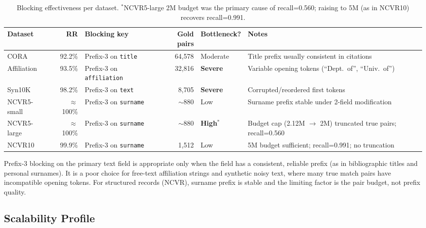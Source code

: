 \documentclass[11pt, a4paper]{article}
\begin{document}
\begin{table}[h!]
\centering
\small
\begin{tabularx}{\linewidth}{lrlrlW}
\toprule
\textbf{Dataset} & \textbf{RR} & \textbf{Blocking key} & \textbf{Gold pairs} &
\textbf{Bottleneck?} & \textbf{Notes} \\
\midrule
CORA         & 92.2\% & Prefix-3 on \texttt{title}       & 64,578  & Moderate & Title prefix usually consistent in citations \\
Affiliation  & 93.5\% & Prefix-3 on \texttt{affiliation} & 32,816  & \textbf{Severe}   & Variable opening tokens (``Dept.\ of'', ``Univ.\ of'') \\
Syn10K       & 98.2\% & Prefix-3 on \texttt{text}        & 8,705   & \textbf{Severe}   & Corrupted/reordered first tokens \\
NCVR5-small  & $\approx$100\% & Prefix-3 on \texttt{surname}   & $\sim$880 & Low & Surname prefix stable under 2-field modification \\
NCVR5-large  & $\approx$100\% & Prefix-3 on \texttt{surname}   & $\sim$880 & \textbf{High}$^*$ & Budget cap (2.12M $\to$ 2M) truncated true pairs; recall=0.560 \\
NCVR10       & 99.9\% & Prefix-3 on \texttt{surname}     & 1,512   & Low & 5M budget sufficient; recall=0.991; no truncation \\
\bottomrule
\end{tabularx}
\caption{Blocking effectiveness per dataset. $^*$NCVR5-large 2M budget was the primary
cause of recall=0.560; raising to 5M (as in NCVR10) recovers recall=0.991.}
\end{table}

Prefix-3 blocking on the primary text field is appropriate only when the field
has a consistent, reliable prefix (as in bibliographic titles and personal surnames).
It is a poor choice for free-text affiliation strings and synthetic noisy text,
where many true match pairs have incompatible opening tokens. For structured records
(NCVR), surname prefix is stable and the limiting factor is the pair budget, not
prefix quality.

\subsection{Scalability Profile}
\end{document}
